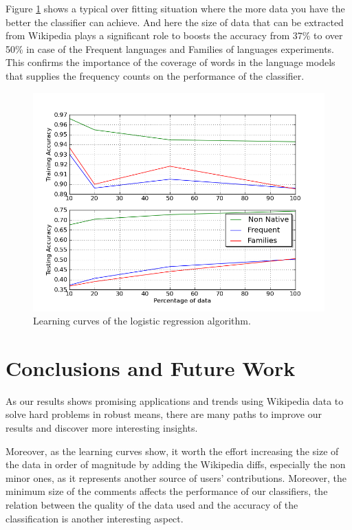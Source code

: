 \documentclass[11pt]{article}
\begin{document}
Figure \ref{comb_lc} shows a typical over fitting situation where the more data
you have the better the classifier can achieve. And here the size of data that
can be extracted from Wikipedia plays a significant role to boosts the accuracy
from 37\% to over 50\% in case of the Frequent languages and Families of
languages experiments. This confirms the importance of the coverage of words in
the language models that supplies the frequency counts on the performance of the classifier.

\begin{figure}[htp]
\centering
\includegraphics[scale=0.45]{combined_lc.png}
\caption{Learning curves of the logistic regression algorithm.}
\label{comb_lc}
\end{figure}


 
\section{Conclusions and Future Work}
\label{conc}
As our results shows promising applications and trends using Wikipedia data to solve hard problems in robust means, there are many paths to improve our results and discover more interesting insights.

Moreover, as the learning curves show, it worth the effort increasing the size
of the data in order of magnitude by adding the Wikipedia diffs, especially the
non minor ones, as it represents another source of users' contributions. Moreover, the minimum size of the comments affects the performance of our classifiers, the relation between the quality of the data used and the accuracy of the classification is another interesting aspect.
\end{document}
